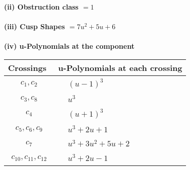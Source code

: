 \documentclass[1p]{elsarticle_modified}
\theoremstyle{definition}
\begin{document}
\flushleft \textbf{(ii) Obstruction class $= 1$}\\~\\
\flushleft \textbf{(iii) Cusp Shapes $= 7 u^2+5 u+6$}\\~\\
\newpage\renewcommand{\arraystretch}{1}
\flushleft \textbf{(iv) u-Polynomials at the component}\newline \\
\begin{tabular}{m{50pt}|m{274pt}}
Crossings & \hspace{64pt}u-Polynomials at each crossing \\
\hline $$\begin{aligned}c_{1},c_{2}\end{aligned}$$&$\begin{aligned}
&(u-1)^3
\end{aligned}$\\
\hline $$\begin{aligned}c_{3},c_{8}\end{aligned}$$&$\begin{aligned}
&u^3
\end{aligned}$\\
\hline $$\begin{aligned}c_{4}\end{aligned}$$&$\begin{aligned}
&(u+1)^3
\end{aligned}$\\
\hline $$\begin{aligned}c_{5},c_{6},c_{9}\end{aligned}$$&$\begin{aligned}
&u^3+2 u+1
\end{aligned}$\\
\hline $$\begin{aligned}c_{7}\end{aligned}$$&$\begin{aligned}
&u^3+3 u^2+5 u+2
\end{aligned}$\\
\hline $$\begin{aligned}c_{10},c_{11},c_{12}\end{aligned}$$&$\begin{aligned}
&u^3+2 u-1
\end{aligned}$\\
\hline
\end{tabular}\\~\\
\newpage\renewcommand{\arraystretch}{1}
\end{document}
